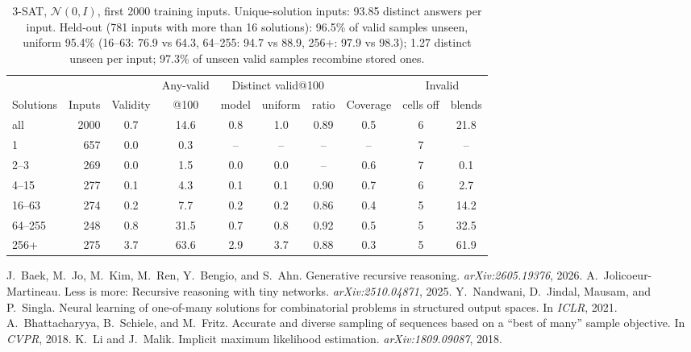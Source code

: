 \documentclass[11pt]{article}
\begin{document}
\begin{table}[H]
\centering\small
\begin{tabular}{@{}lrcccccccc@{}}
\toprule
& & & Any-valid & \multicolumn{3}{c}{Distinct valid@100} & & \multicolumn{2}{c}{Invalid} \\
\cmidrule(lr){5-7}\cmidrule(l){9-10}
Solutions & Inputs & Validity & @100 & model & uniform & ratio & Coverage & cells off & blends \\
\midrule
all & 2000 & 0.7 & 14.6 & 0.8 & 1.0 & 0.89 & 0.5 & 6 & 21.8 \\
1 & 657 & 0.0 & 0.3 & -- & -- & -- & -- & 7 & -- \\
2--3 & 269 & 0.0 & 1.5 & 0.0 & 0.0 & -- & 0.6 & 7 & 0.1 \\
4--15 & 277 & 0.1 & 4.3 & 0.1 & 0.1 & 0.90 & 0.7 & 6 & 2.7 \\
16--63 & 274 & 0.2 & 7.7 & 0.2 & 0.2 & 0.86 & 0.4 & 5 & 14.2 \\
64--255 & 248 & 0.8 & 31.5 & 0.7 & 0.8 & 0.92 & 0.5 & 5 & 32.5 \\
256+ & 275 & 3.7 & 63.6 & 2.9 & 3.7 & 0.88 & 0.3 & 5 & 61.9 \\
\bottomrule
\end{tabular}
\caption{3-SAT, $\mathcal{N}(0,I)$, first 2000 training inputs. Unique-solution inputs: 93.85 distinct answers per input. Held-out (781 inputs with more than 16 solutions): 96.5\% of valid samples unseen, uniform 95.4\% (16--63: 76.9 vs 64.3, 64--255: 94.7 vs 88.9, 256+: 97.9 vs 98.3); 1.27 distinct unseen per input; 97.3\% of unseen valid samples recombine stored ones.}
\end{table}


\clearpage

\begin{thebibliography}{99}\small
{} J.~Baek, M.~Jo, M.~Kim, M.~Ren, Y.~Bengio, and S.~Ahn. Generative recursive reasoning.
\emph{arXiv:2605.19376}, 2026.
 A.~Jolicoeur-Martineau. Less is more: Recursive reasoning with tiny networks.
\emph{arXiv:2510.04871}, 2025.
 Y.~Nandwani, D.~Jindal, Mausam, and P.~Singla. Neural learning of one-of-many
solutions for combinatorial problems in structured output spaces. In \emph{ICLR}, 2021.
 A.~Bhattacharyya, B.~Schiele, and M.~Fritz. Accurate and diverse sampling of
sequences based on a ``best of many'' sample objective. In \emph{CVPR}, 2018.
 K.~Li and J.~Malik. Implicit maximum likelihood estimation. \emph{arXiv:1809.09087}, 2018.
\end{thebibliography}
\end{document}
